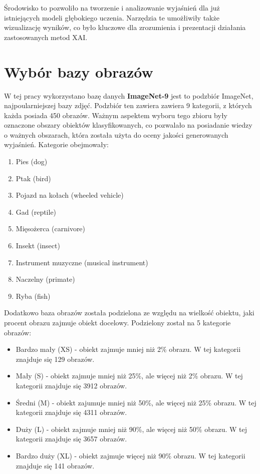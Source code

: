Środowisko to pozwoliło na tworzenie i analizowanie wyjaśnień dla już istniejących modeli głębokiego uczenia.
Narzędzia te umożłiwiły także wizualizację wyników, co było kluczowe dla zrozumienia i prezentacji działania zastosowanych metod XAI.

\section*{Wybór bazy obrazów}

W tej pracy wykorzystano bazę danych \textbf{ImageNet-9}\cite{imagenet} jest to podzbiór ImageNet, najpoularniejszej bazy zdjęć.
Podzbiór ten zawiera zawiera 9 kategorii, z których każda posiada 450 obrazów.
Ważnym aspektem wyboru tego zbioru były oznaczone obszary obiektów klasyfikowanych, co pozwalało na posiadanie wiedzy o ważnych obszarach, która została użyta do oceny jakości generowanych wyjaśnień.
Kategorie obejmowały:
\begin{enumerate}
	\item Pies (dog)
	\item Ptak (bird)
	\item Pojazd na kołach (wheeled vehicle)
	\item Gad (reptile)
	\item Mięsożerca (carnivore)
	\item Insekt (insect)
	\item Instrument muzyczne (musical instrument)
	\item Naczelny (primate)
	\item Ryba (fish)
\end{enumerate}

Dodatkowo baza obrazów została podzielona ze względu na wielkość obiektu, jaki procent obrazu zajmuje obiekt docelowy.
Podzielony został na 5 kategorie obrazów:
\begin{itemize}
    \item Bardzo mały (XS) - obiekt zajmuje mniej niż 2\% obrazu. W tej kategorii znajduje się 129 obrazów.
    \item Mały (S) - obiekt zajmuje mniej niż 25\%, ale więcej niż 2\% obrazu. W tej kategorii znajduje się 3912 obrazów.
    \item Średni (M) - obiekt zajumuje mniej niż 50\%, ale więcej niż 25\% obrazu. W tej kategorii znajduje się 4311 obrazów.
    \item Duży (L) - obiekt zajmuje mniej niż 90\%, ale więcej niż 50\% obrazu. W tej kategorii znajduje się 3657 obrazów.
    \item Bardzo duży (XL) - obiekt zajmuje więcej niż 90\% obrazu. W tej kategorii znajduje się 141 obrazów.
\end{itemize}

